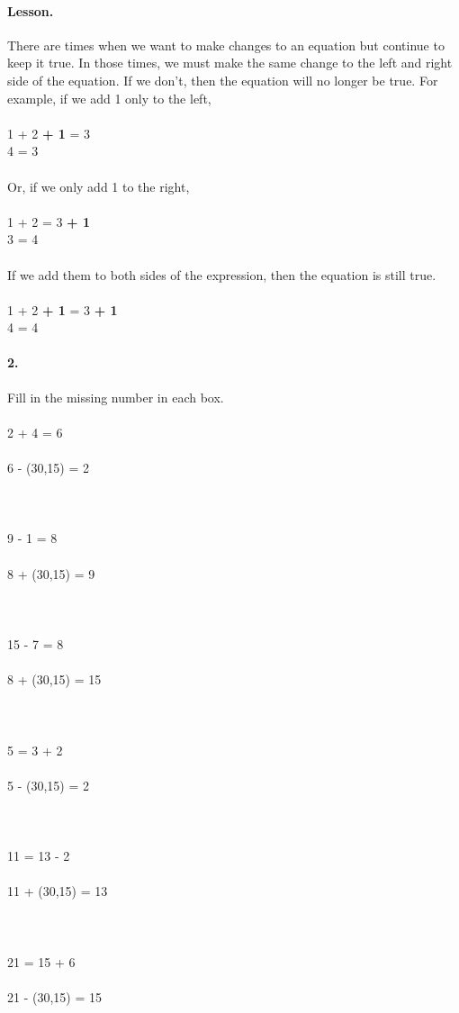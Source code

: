 \documentclass[12pt]{article}
\begin{document}
\newpage

\paragraph{Lesson.}
There are times when we want to make changes to an equation but continue to keep it true. In those times, we must make the same change to the left and right side of the equation. If we don't, then the equation will no longer be true. For example, if we add 1 only to the left, \\
\\
1 + 2 \textbf{+ 1} = 3 \\
4 = 3 \\
\\
Or, if we only add 1 to the right, \\
\\
1 + 2 = 3 \textbf{+ 1} \\
3 = 4 \\
\\
If we add them to both sides of the expression, then the equation is still true. \\
\\
1 + 2 \textbf{+ 1} = 3 \textbf{+ 1} \\
4 = 4

\newpage

\paragraph{2.}
Fill in the missing number in each box. \\
\\
2 + 4 = 6 \\
\\
6 - \framebox(30,15){} = 2 \\
\\
\\
\\
9 - 1 = 8 \\
\\
8 + \framebox(30,15){} = 9 \\
\\
\\
\\
15 - 7 = 8 \\
\\
8 + \framebox(30,15){} = 15 \\
\\
\\
\\
5 = 3 + 2 \\
\\
5 - \framebox(30,15){} = 2 \\
\\
\\
\\
11 = 13 - 2 \\
\\
11 + \framebox(30,15){} = 13 \\
\\
\\
\\
21 = 15 + 6 \\
\\
21 - \framebox(30,15){} = 15 \\
\end{document}
